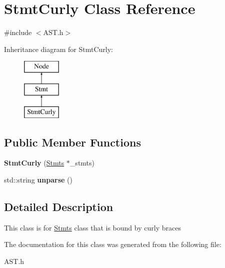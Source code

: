 \hypertarget{classStmtCurly}{\section{Stmt\-Curly Class Reference}
\label{classStmtCurly}
}


{\ttfamily \#include $<$A\-S\-T.\-h$>$}

Inheritance diagram for Stmt\-Curly\-:\begin{figure}[H]
\begin{center}
\leavevmode
\includegraphics[height=3.000000cm]{classStmtCurly}
\end{center}
\end{figure}
\subsection*{Public Member Functions}
\begin{DoxyCompactItemize}
\item 
\hypertarget{classStmtCurly_a0bd237c8abfe36aca97523792554b758}{{\bfseries Stmt\-Curly} (\hyperlink{classStmts}{Stmts} $\ast$\-\_\-stmts)}\label{classStmtCurly_a0bd237c8abfe36aca97523792554b758}

\item 
\hypertarget{classStmtCurly_a99d6e416a3a1a06034ad9bfa78b8593c}{std\-::string {\bfseries unparse} ()}\label{classStmtCurly_a99d6e416a3a1a06034ad9bfa78b8593c}

\end{DoxyCompactItemize}


\subsection{Detailed Description}
This class is for \hyperlink{classStmts}{Stmts} class that is bound by curly braces 

The documentation for this class was generated from the following file\-:\begin{DoxyCompactItemize}
\item 
A\-S\-T.\-h\end{DoxyCompactItemize}
